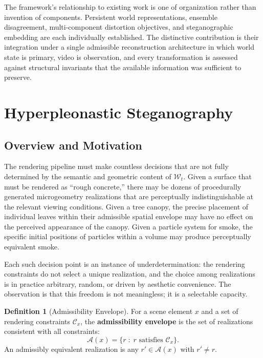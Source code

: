 \documentclass[11pt,a4paper]{article}
\theoremstyle{plain}
\theoremstyle{definition}
\newtheorem{definition}[theorem]{Definition}
\theoremstyle{remark}
\begin{document}
The framework's relationship to existing work is one of organization rather than invention of components. Persistent world representations, ensemble disagreement, multi-component distortion objectives, and steganographic embedding are each individually established. The distinctive contribution is their integration under a single admissible reconstruction architecture in which world state is primary, video is observation, and every transformation is assessed against structural invariants that the available information was sufficient to preserve.


\appendix

\section{Hyperpleonastic Steganography}
\label{app:steg}

\subsection{Overview and Motivation}

The rendering pipeline must make countless decisions that are not fully determined by the semantic and geometric content of $\mathcal{W}_t$. Given a surface that must be rendered as ``rough concrete,'' there may be dozens of procedurally generated microgeometry realizations that are perceptually indistinguishable at the relevant viewing conditions. Given a tree canopy, the precise placement of individual leaves within their admissible spatial envelope may have no effect on the perceived appearance of the canopy. Given a particle system for smoke, the specific initial positions of particles within a volume may produce perceptually equivalent smoke.

Each such decision point is an instance of underdetermination: the rendering constraints do not select a unique realization, and the choice among realizations is in practice arbitrary, random, or driven by aesthetic convenience. The observation is that this freedom is not meaningless; it is a selectable capacity.

\begin{definition}[Admissibility Envelope]
For a scene element $x$ and a set of rendering constraints $\mathcal{C}_x$, the \textbf{admissibility envelope} is the set of realizations consistent with all constraints:
\[
\mathcal{A}(x) = \{ r \;:\; r \text{ satisfies } \mathcal{C}_x \}.
\]
An admissibly equivalent realization is any $r' \in \mathcal{A}(x)$ with $r' \neq r$.
\end{definition}
\end{document}
